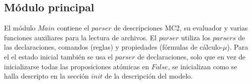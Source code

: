 \subsection{Módulo principal}

El módulo $Main$ contiene el $parser$ de descripciones MC2, su evaluador y varias funciones auxiliares para la lectura de archivos. El $parser$ utiliza los $parsers$ de las declaraciones, comandos (reglas) y propiedades (fórmulas de cálculo-$\mu$). Para el el estado inicial también se usa el $parser$ de declaraciones, solo que en vez de inicializarse todas las proposiciones atómicas en $False$, se inicializan como se halla descripto en la sección $init$ de la descripción del modelo.